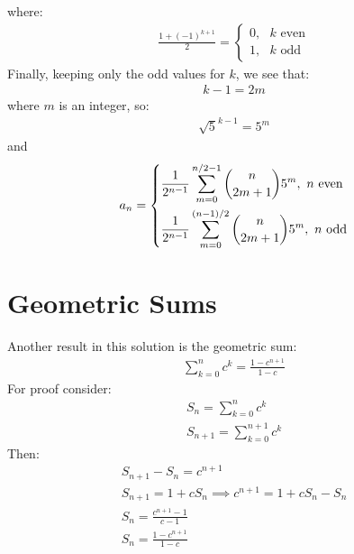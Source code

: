 \documentclass{article}
\begin{document}
where:
\begin{gather*}
\frac{1 + (-1)^{k + 1}}{2} = \begin{cases}
	0,\text{ }k\text{ even}\\
	1,\text{ }k\text{ odd}
\end{cases}
\end{gather*}
Finally, keeping only the odd values for $k$, we see that:
\begin{gather}
	k - 1 = 2m
\end{gather}
where $m$ is an integer, so:
\begin{gather*}
	\sqrt{5}^{k - 1} = 5^{m}
\end{gather*}
and
\begin{gather*}
	a_{n} = \begin{dcases*}
		\frac{1}{2^{n - 1}}\sum_{m = 0}^{n/2 - 1}{n \choose 2m + 1}5^{m},\text{ }n\text{ even}\\
		\frac{1}{2^{n - 1}}\sum_{m = 0}^{(n - 1)/2}{n \choose 2m + 1}5^{m},\text{ }n\text{ odd}
	\end{dcases*}
\end{gather*}
\section*{Geometric Sums}
Another result in this solution is the geometric sum:
\begin{gather*}
	\sum_{k = 0}^{n}c^{k} = \frac{1 - c^{n + 1}}{1 - c}
\end{gather*}
For proof consider:
\begin{gather*}
	S_{n} = \sum_{k = 0}^{n}c^{k}\\
	S_{n + 1} = \sum_{k = 0}^{n + 1}c^{k}
\end{gather*}
Then:
\begin{gather*}
	S_{n + 1} - S_{n} = c^{n + 1}\\
	S_{n + 1} = 1 + cS_{n} \implies c^{n + 1} = 1 + cS_{n} - S_{n}\\
	S_{n} = \frac{c^{n + 1} - 1}{c - 1}\\
	S_{n} = \frac{1 - c^{n + 1}}{1 - c}
\end{gather*}
\end{document}
